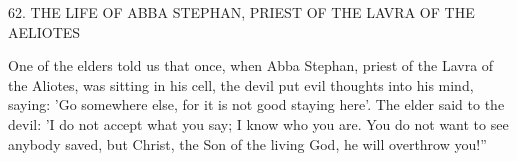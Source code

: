62.
THE LIFE OF ABBA STEPHAN, PRIEST OF
THE LAVRA OF THE AELIOTES

One of the elders told us that once, when Abba Stephan, priest of
the Lavra of the Aliotes, was sitting in his cell, the devil put evil
thoughts into his mind, saying: 'Go somewhere else, for it is not
good staying here'.
The elder said to the devil: 'I do not accept what
you say; I know who you are.
You do not want to see anybody
saved, but Christ, the Son of the living God, he will overthrow you!”

